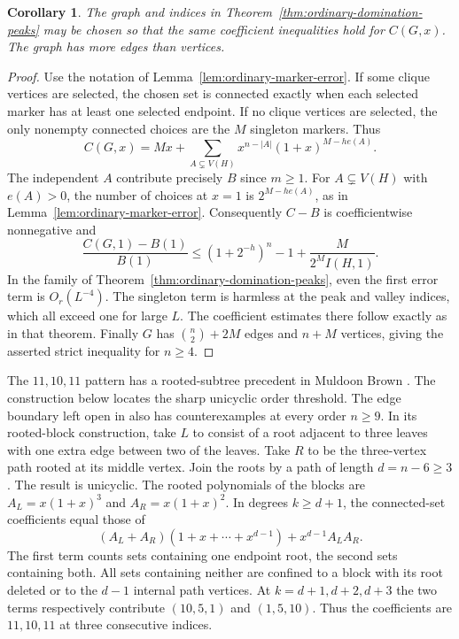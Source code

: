 \documentclass[11pt,a4paper]{article}
\newtheorem{corollary}[theorem]{Corollary}
\begin{document}
\begin{corollary}\label{cor:connected-set-peaks}
The graph and indices in Theorem~\ref{thm:ordinary-domination-peaks}
may be chosen so that the same coefficient inequalities hold for
$C(G,x)$. The graph has more edges than vertices.
\end{corollary}
\begin{proof}
Use the notation of Lemma~\ref{lem:ordinary-marker-error}.
If some clique vertices are selected, the chosen set is connected
exactly when each selected marker has at least one selected endpoint.
If no clique vertices are selected, the only nonempty connected
choices are the $M$ singleton markers. Thus
\[
 C(G,x)=Mx+\sum_{A\subsetneq V(H)}
       x^{n-|A|}(1+x)^{M-he(A)}.
\]
The independent $A$ contribute precisely $B$ since $m\ge1$.
For $A\subsetneq V(H)$ with $e(A)>0$, the number of choices at $x=1$
is $2^{M-he(A)}$, as in Lemma~\ref{lem:ordinary-marker-error}.
Consequently $C-B$ is coefficientwise nonnegative and
\[
 \frac{C(G,1)-B(1)}{B(1)}
 \le (1+2^{-h})^n-1+\frac{M}{2^M I(H,1)}.
\]
In the family of Theorem~\ref{thm:ordinary-domination-peaks}, even
the first error term is $O_r(L^{-4})$. The singleton term is harmless
at the peak and valley indices, which all exceed one for large $L$.
The coefficient estimates there follow exactly as in that theorem.
Finally $G$ has $\binom n2+2M$ edges and $n+M$ vertices, giving
the asserted strict inequality for $n\ge4$.
\end{proof}

The $11,10,11$ pattern has a rooted-subtree precedent in Muldoon Brown \cite[Figure~1]{muldoon}. The construction below locates the sharp unicyclic order threshold.
The edge boundary left open in \cite[Sec.~5]{carptopusconnected} also
has counterexamples at every order $n\ge9$. In its rooted-block
construction, take $L$ to consist of a root adjacent to three leaves
with one extra edge between two of the leaves. Take $R$ to be the
three-vertex path rooted at its middle vertex. Join the roots by a
path of length $d=n-6\ge3$. The result is unicyclic. The rooted
polynomials of the blocks are $A_L=x(1+x)^3$ and $A_R=x(1+x)^2$.
In degrees $k\ge d+1$, the connected-set coefficients equal those of
\[
 (A_L+A_R)(1+x+\cdots+x^{d-1})+x^{d-1}A_LA_R.
\]
The first term counts sets containing one endpoint root, the second
sets containing both. All sets containing neither are confined to a
block with its root deleted or to the $d-1$ internal path vertices.
At $k=d+1,d+2,d+3$ the two terms respectively contribute $(10,5,1)$
and $(1,5,10)$. Thus the coefficients are $11,10,11$ at three
consecutive indices.
\end{document}
